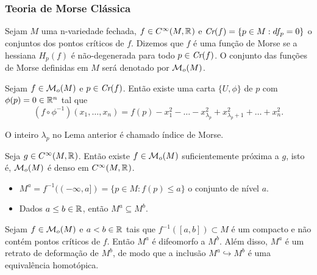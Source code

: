 \documentclass{beamer}
\begin{document}
	\begin{frame}
		\frametitle{Teoria de Morse Clássica}
		\begin{definicao}
			Sejam $M$ uma n-variedade fechada, $f \in C^{\infty}(M, \mathbb{R}^{})$ e $\textit{Cr}(f) = \{p \in M: df_{p} = 0\}$ o conjuntos dos pontos críticos de $f$. Dizemos que $f$ é uma função de Morse se a hessiana $H_{p}(f)$ é não-degenerada para todo $p \in \textit{Cr}(f)$. O conjunto das funções de Morse definidas em $M$ será denotado por $\mathcal{M}_{o}(M)$. 
		\end{definicao}
		\begin{lema}
			Sejam $f \in \mathcal{M}_{o}(M)$ e $p \in \textit{Cr}(f)$. Então existe uma carta $\{U, \phi\}$ de $p$ com $\phi(p)=0 \in \mathbb{R}^{n}$ tal que 
			$$
			(f\circ \phi^{-1})(x_{1}, \dots, x_{n}) = f(p)-x_{1}^{2}-\dots -x^{2}_{\lambda_{p}}+x^{2}_{\lambda_{p}+1}+\dots + x^{2}_{n}.
			$$
		\end{lema}
	\end{frame}
	
	\begin{frame}
		
		\begin{definicao}
			O inteiro $\lambda_{p}$ no Lema anterior é chamado índice de Morse.
		\end{definicao}
		
		\pause
		\begin{teorema}
			Seja $g\in C^{\infty}(M, \mathbb{R}^{})$. Então existe $f \in \mathcal{M}_{o}(M)$ suficientemente próxima a $g$, isto é, $\mathcal{M}_{o}(M)$ é denso em $C^{\infty}(M, \mathbb{R}^{})$.
		\end{teorema}
	\end{frame}
	
	\begin{frame}
			\begin{itemize}
				\item $M^{a}= f^{-1}((-\infty, a]) = \{p \in M: f(p)\leq a\}$ o conjunto de nível $a$. 
				
				\item Dados $a\leq b \in \mathbb{R}^{}$, então $M^{a} \subseteq M^{b}$.
			\end{itemize}
			
			\pause
			\begin{teorema}
				Sejam $f \in \mathcal{M}_{o}(M)$ e $a<b \in \mathbb{R}^{}$ tais que $f^{-1}([a,b])\subset M$ é um compacto e não contém pontos críticos de $f$. Então $M^{a}$ é difeomorfo a $M^{b}$. Além disso, $M^{a}$ é um retrato de deformação de $M^{b}$, de modo que a inclusão  $M^{a} \hookrightarrow M^{b}$ é uma equivalência homotópica.
			\end{teorema}
			
	\end{frame}
	
\end{document}
